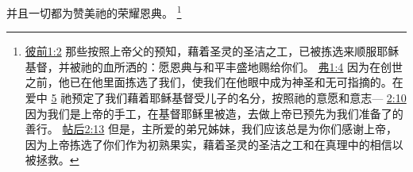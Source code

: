 \documentclass[12pt, a4paper, oneside]{ctexart}
\begin{document}
	并且一切都为赞美祂的荣耀恩典。
	\footnote {
		\href{https://biblehub.com/1_peter/1-2.htm}{彼前1:2} 那些按照上帝父的预知，藉着圣灵的圣洁之工，已被拣选来顺服耶稣基督，并被祂的血所洒的：愿恩典与和平丰盛地赐给你们。
		\href{https://biblehub.com/ephesians/1-4.htm}{弗1:4} 因为在创世之前，他已在他里面拣选了我们，使我们在他眼中成为神圣和无可指摘的。在爱中
		\href{https://biblehub.com/ephesians/1-5.htm}{5} 祂预定了我们藉着耶稣基督受儿子的名分，按照祂的意愿和意志---
		\href{https://biblehub.com/ephesians/2-10.htm}{2:10} 因为我们是上帝的手工，在基督耶稣里被造，去做上帝已预先为我们准备了的善行。
		\href{https://biblehub.com/2_thessalonians/2-13.htm}{帖后2:13} 但是，主所爱的弟兄姊妹，我们应该总是为你们感谢上帝，因为上帝拣选了你们作为初熟果实，藉着圣灵的圣洁之工和在真理中的相信以被拯救。
	}
	
\end{document}

